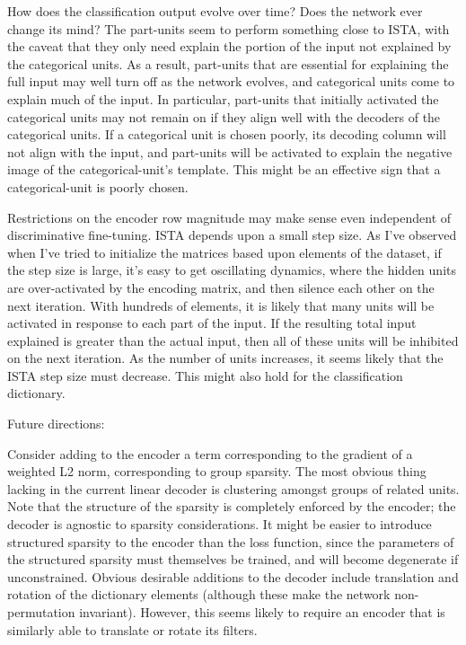 How does the classification output evolve over time?  Does the network ever change its mind?  The part-units seem to perform something close to ISTA, with the caveat that they only need explain the portion of the input not explained by the categorical units.  As a result, part-units that are essential for explaining the full input may well turn off as the network evolves, and categorical units come to explain much of the input.  In particular, part-units that initially activated the categorical units may not remain on if they align well with the decoders of the categorical units.  If a categorical unit is chosen poorly, its decoding column will not align with the input, and part-units will be activated to explain the negative image of the categorical-unit's template.  This might be an effective sign that a categorical-unit is poorly chosen.  


Restrictions on the encoder row magnitude may make sense even independent of discriminative fine-tuning.  ISTA depends upon a small step size.  As I've observed when I've tried to initialize the matrices based upon elements of the dataset, if the step size is large, it's easy to get oscillating dynamics, where the hidden units are over-activated by the encoding matrix, and then silence each other on the next iteration.  With hundreds of elements, it is likely that many units will be activated in response to each part of the input.  If the resulting total input explained is greater than the actual input, then all of these units will be inhibited on the next iteration.  As the number of units increases, it seems likely that the ISTA step size must decrease.  This might also hold for the classification dictionary.








Future directions:

Consider adding to the encoder a term corresponding to the gradient of a weighted L2 norm, corresponding to group sparsity.  The most obvious thing lacking in the current linear decoder is clustering amongst groups of related units.  Note that the structure of the sparsity is completely enforced by the encoder; the decoder is agnostic to sparsity considerations.  It might be easier to introduce structured sparsity to the encoder than the loss function, since the parameters of the structured sparsity must themselves be trained, and will become degenerate if unconstrained.
Obvious desirable additions to the decoder include translation and rotation of the dictionary elements (although these make the network non-permutation invariant).  However, this seems likely to require an encoder that is similarly able to translate or rotate its filters.

